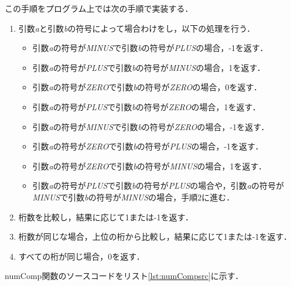 \documentclass[a4paper,11pt,dvipdfmx]{jsarticle}
\begin{document}
この手順をプログラム上では次の手順で実装する．
\begin{enumerate}
    \item 引数\textit{a}と引数\textit{b}の符号によって場合わけをし，以下の処理を行う．
    \begin{itemize}
        \item 引数\textit{a}の符号が\textit{MINUS}で引数\textit{b}の符号が\textit{PLUS}の場合，-1を返す．
        \item 引数\textit{a}の符号が\textit{PLUS}で引数\textit{b}の符号が\textit{MINUS}の場合，1を返す．
        \item 引数\textit{a}の符号が\textit{ZERO}で引数\textit{b}の符号が\textit{ZERO}の場合，0を返す．
        \item 引数\textit{a}の符号が\textit{PLUS}で引数\textit{b}の符号が\textit{ZERO}の場合，1を返す．
        \item 引数\textit{a}の符号が\textit{MINUS}で引数\textit{b}の符号が\textit{ZERO}の場合，-1を返す．
        \item 引数\textit{a}の符号が\textit{ZERO}で引数\textit{b}の符号が\textit{PLUS}の場合，-1を返す．
        \item 引数\textit{a}の符号が\textit{ZERO}で引数\textit{b}の符号が\textit{MINUS}の場合，1を返す．
        \item 引数\textit{a}の符号が\textit{PLUS}で引数\textit{b}の符号が\textit{PLUS}の場合や，引数\textit{a}の符号が\textit{MINUS}で引数\textit{b}の符号が\textit{MINUS}の場合，手順2に進む．
    \end{itemize}
    \item 桁数を比較し，結果に応じて1または-1を返す．
    \item 桁数が同じな場合，上位の桁から比較し，結果に応じて1または-1を返す．
    \item すべての桁が同じ場合，0を返す．
\end{enumerate}

numComp関数のソースコードをリスト\ref{lst:numCompsrc}に示す．
\end{document}
